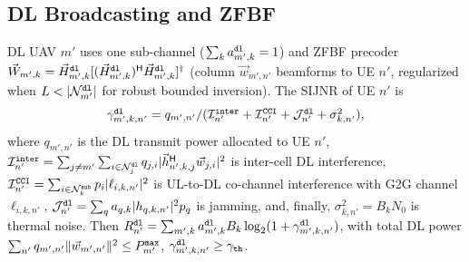 \documentclass[journal]{IEEEtran}
\begin{document}
\subsection{DL Broadcasting and ZFBF}
\label{sec:dl}
DL UAV $m'$ uses one sub-channel ($\sum_k a_{m',k}^{\tt dl}=1$) and ZFBF precoder $\vec{W}_{m',k}=\vec{H}_{m',k}^{\tt dl}[(\vec{H}_{m',k}^{\tt dl})^{\sf H}\vec{H}_{m',k}^{\tt dl}]^{\dagger}$ {\color{blue}(column $\vec{w}_{m',n'}$ beamforms to UE $n'$, regularized when $L<|\mathcal{N}_{m'}^{\tt dl}|$ for robust bounded inversion)}. The SIJNR of UE $n'$ is
\begin{equation}
\textstyle\gamma_{m',k,n'}^{\tt dl}=q_{m',n'}/(\mathcal{I}_{n'}^{\tt inter}+\mathcal{I}_{n'}^{\tt CCI}+\mathcal{J}_{n'}^{\tt dl}+\sigma_{k,n'}^2),
\label{eq:dl_sijnr}
\end{equation}
where {$q_{m',n'}$ is the DL transmit power allocated to UE $n'$}, $\mathcal{I}_{n'}^{\tt inter}=\sum_{j\neq m'}\sum_{i\in\mathcal{N}_j^{\tt dl}}q_{j,i}|\vec{h}_{n',k,j}^{\sf H}{\vec{w}_{j,i}}|^2$ is inter-cell DL interference,
$\mathcal{I}_{n'}^{\tt CCI}=\sum_{i\in\mathcal{N}_k^{\tt sub}}p_i|\ell_{i,k,n'}|^2$ is UL-to-DL co-channel interference with G2G channel $\ell_{i,k,n'}$,
$\mathcal{J}_{n'}^{\tt dl}=\sum_{q}a_{q,k}|h_{q,k,n'}|^2 p_q$ is jamming, and, finally,
$\sigma_{k,n'}^2=B_k N_0$ is thermal noise.
Then $R_{n'}^{\tt dl}=\sum_{m',k}a_{m',k}^{\tt dl}B_k\log_2(1+\gamma_{m',k,n'}^{\tt dl})$, with total DL power $\sum_{n'}q_{m',n'}\Vert\vec{w}_{m',n'}\Vert^2\le P_{m'}^{\tt max}$, $\gamma_{m',k,n'}^{\tt dl}\ge\gamma_{\tt th}$.
\end{document}
